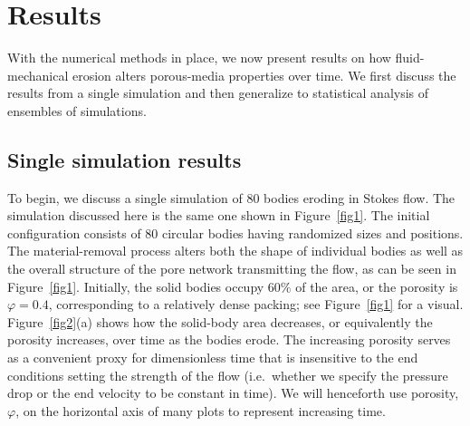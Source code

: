 \documentclass[3p]{elsarticle}
\begin{document}
\section{Results}
\label{sec:results}

With the numerical methods in place, we now present results on how fluid-mechanical erosion alters porous-media properties over time. We first discuss the results from a single simulation and then generalize to statistical analysis of ensembles of simulations.  

\subsection{Single simulation results}
\label{sec:single_sim}

To begin, we discuss a single simulation of 80 bodies eroding in Stokes flow. The simulation discussed here is the same one shown in Figure~\ref{fig1}. The initial configuration consists of 80 circular bodies having randomized sizes and positions. The material-removal process alters both the shape of individual bodies as well as the overall structure of the pore network transmitting the flow, as can be seen in Figure~\ref{fig1}. Initially, the solid bodies occupy $60\%$ of the area, or the porosity is $\varphi = 0.4$, corresponding to a relatively dense packing; see Figure~\ref{fig1} for a visual. Figure~\ref{fig2}(a) shows how the solid-body area decreases, or equivalently the porosity increases, over time as the bodies erode. The increasing porosity serves as a convenient proxy for dimensionless time that is insensitive to the end conditions setting the strength of the flow (i.e.~whether we specify the pressure drop or the end velocity to be constant in time). We will henceforth use porosity, $\varphi$, on the horizontal axis of many plots to represent increasing time.
\end{document}

